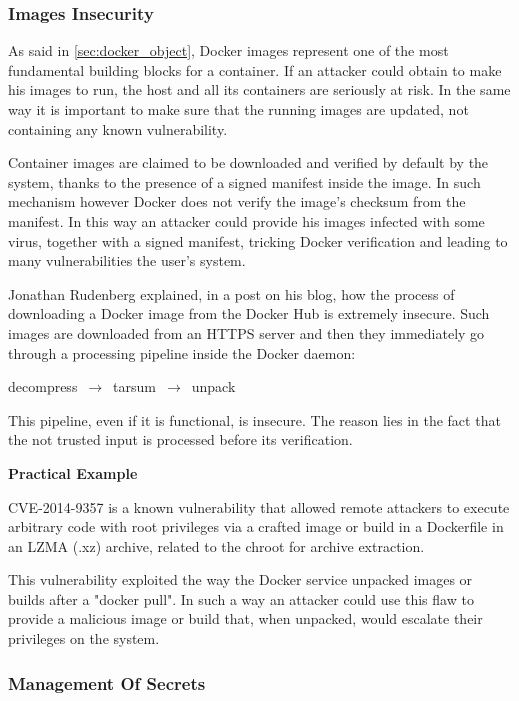 \documentclass[a4paper,12pt]{article}
\begin{document}
\subsubsection{Images Insecurity}

As said in \ref{sec:docker_object}, Docker images represent one of the most
fundamental building blocks for a container. If an attacker could obtain to make
his images to run, the host and all its containers are seriously at risk. In the
same way it is important to make sure that the running images are updated, not
containing any known vulnerability.\par Container images are claimed to be
downloaded and verified by default by the system, thanks to the presence of a
signed manifest inside the image. In such mechanism however Docker does not
verify the image's checksum from the manifest. In this way an attacker could
provide his images infected with some virus, together with a signed manifest,
tricking Docker verification and leading to many vulnerabilities the user's
system. \par Jonathan Rudenberg explained, in a
post\cite{docker_image_insecurity} on his blog, how the process of downloading a
Docker image from the Docker Hub is extremely insecure. Such images are
downloaded from an HTTPS server and then they immediately go through a
processing pipeline inside the Docker daemon: \bigbreak\centerline{decompress
$\,\to\,$ tarsum $\,\to\,$ unpack}\bigbreak This pipeline, even if it is
functional, is insecure. The reason lies in the fact that the not trusted input
is processed before its verification. 

\bigbreak\textbf{Practical Example}\bigbreak 

CVE-2014-9357\cite{CVE-2014-9357} is a known vulnerability that allowed remote
attackers to execute arbitrary code with root privileges via a crafted image or
build in a Dockerfile in an LZMA (.xz) archive, related to the chroot for
archive extraction.\par This vulnerability exploited the way the Docker service
unpacked images or builds after a "docker pull". In such a way an attacker could
use this flaw to provide a malicious image or build that, when unpacked, would
escalate their privileges on the system.

\subsubsection{Management Of Secrets}
\end{document}
